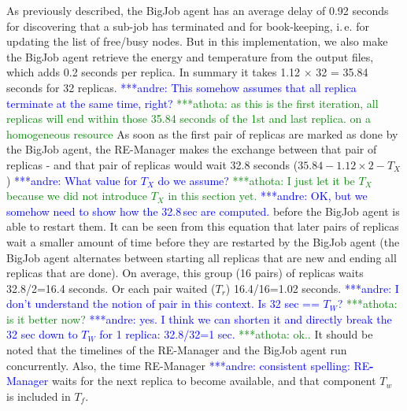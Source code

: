 \documentclass{rspublic}
\newcommand{\alnote}[1]{ {\textcolor{blue} { ***andre: #1 }}}
\newcommand{\athotanote}[1]{ {\textcolor{green} { ***athota: #1 }}}
\newcommand{\alnote}[1]{}
\newcommand{\athotanote}[1]{}
\begin{document}
As previously described, the BigJob agent has an average delay of 0.92 seconds 
for discovering that a sub-job has terminated and for book-keeping, i.\,e. for
updating the list of free/busy nodes. But in this
implementation, we also make the BigJob agent retrieve the energy
and temperature from the output files, which adds 0.2 seconds per
replica. In summary it takes 1.12 $\times$ 32 = 35.84 seconds for 32
replicas. \alnote{This somehow assumes that all replica terminate at
the same time, right?} \athotanote{as this is the first iteration, all replicas will end within those 35.84 seconds of the 1st and last replica. on a homogeneous resource} As soon as the first pair of replicas are marked as done by the
BigJob agent, the RE-Manager makes the exchange between that pair of replicas 
- and that pair of replicas would wait 32.8 seconds ($35.84-1.12\times2-T_X$) 
\alnote{What value for $T_{X}$ do we assume?} \athotanote{I just let it be $T_X$ because we did not introduce $T_X$ in this section yet.} \alnote{OK, but we somehow need to show how the 32.8\,sec are computed.}
before the BigJob agent is able to restart them. It can be seen from this 
equation that later pairs of replicas wait a smaller amount of time before 
they are restarted by the BigJob agent (the BigJob agent alternates between 
starting all replicas that are new and ending all replicas that are done). 
On average, this group (16 pairs) of replicas waits  32.8/2=16.4 seconds. 
Or each pair waited ($T_r$) 16.4/16=1.02 seconds.  \alnote{I don't understand 
the notion of pair in this context. Is 32 sec == $T_W$?}\athotanote{is it better now?}\alnote{yes. I think
we can shorten it and directly break the 32 sec down to $T_W$ for 1 replica: 32.8/32=1 sec.} \athotanote{ok..}
It should be noted that the timelines of the RE-Manager and the BigJob 
agent run concurrently. Also, the time RE-Manager\alnote{consistent spelling: RE\textbf{-}Manager} 
waits for the next replica to  become available, and that component $T_w$ is included in $T_f$.
\end{document}
